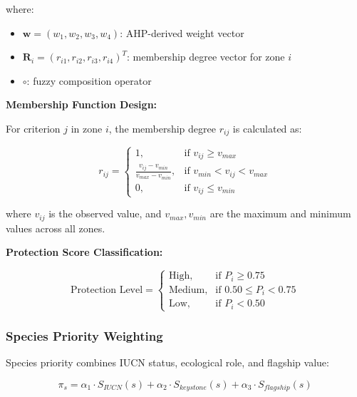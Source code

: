 where:
\begin{itemize}
\item $\mathbf{w} = (w_1, w_2, w_3, w_4)$: AHP-derived weight vector
\item $\mathbf{R}_i = (r_{i1}, r_{i2}, r_{i3}, r_{i4})^T$: membership degree vector for zone $i$
\item $\circ$: fuzzy composition operator
\end{itemize}

\textbf{Membership Function Design:}

For criterion $j$ in zone $i$, the membership degree $r_{ij}$ is calculated as:

\begin{equation}
r_{ij} = \begin{cases}
1, & \text{if } v_{ij} \geq v_{max} \\
\frac{v_{ij} - v_{min}}{v_{max} - v_{min}}, & \text{if } v_{min} < v_{ij} < v_{max} \\
0, & \text{if } v_{ij} \leq v_{min}
\end{cases}
\label{eq:membership}
\end{equation}

where $v_{ij}$ is the observed value, and $v_{max}, v_{min}$ are the maximum and minimum values across all zones.

\textbf{Protection Score Classification:}

\begin{equation}
\text{Protection Level} = \begin{cases}
\text{High}, & \text{if } P_i \geq 0.75 \\
\text{Medium}, & \text{if } 0.50 \leq P_i < 0.75 \\
\text{Low}, & \text{if } P_i < 0.50
\end{cases}
\label{eq:protection_level}
\end{equation}

\subsubsection{Species Priority Weighting}

Species priority combines IUCN status, ecological role, and flagship value:

\begin{equation}
\pi_s = \alpha_1 \cdot S_{IUCN}(s) + \alpha_2 \cdot S_{keystone}(s) + \alpha_3 \cdot S_{flagship}(s)
\label{eq:species_priority}
\end{equation}

